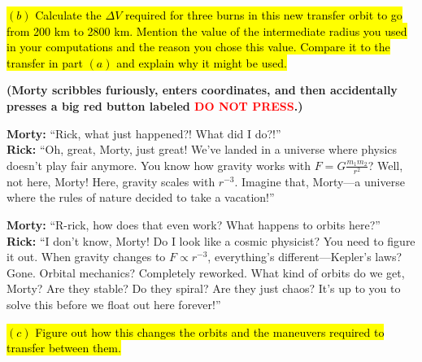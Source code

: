 \documentclass[a4paper, 12pt]{exam}
\begin{document}
\begin{center}
\end{center}

\hl{$(b)$ Calculate the $\Delta V$ required for three burns in this new transfer orbit to go from 200 km to 2800 km. Mention the value of the intermediate radius you used in your computations and the reason you chose this value. Compare it to the transfer in part $(a)$ and explain why it might be used.}

\bigskip

\noindent \textbf{(Morty scribbles furiously, enters coordinates, and then accidentally presses a big red button labeled \textcolor{red}{DO NOT PRESS}.)}

\bigskip

\noindent \textbf{Morty:} “Rick, what just happened?! What did I do?!” \\

\noindent \textbf{Rick:} “Oh, great, Morty, just great! We’ve landed in a universe where physics doesn’t play fair anymore. You know how gravity works with $F = G \frac{m_1 m_2}{r^2}$? Well, not here, Morty! Here, gravity scales with $r^{-3}$. Imagine that, Morty—a universe where the rules of nature decided to take a vacation!”

\bigskip

\noindent \textbf{Morty:} “R-rick, how does that even work? What happens to orbits here?” \\

\noindent \textbf{Rick:} “I don’t know, Morty! Do I look like a cosmic physicist? You need to figure it out. When gravity changes to $F \propto r^{-3}$, everything’s different—Kepler’s laws? Gone. Orbital mechanics? Completely reworked. What kind of orbits do we get, Morty? Are they stable? Do they spiral? Are they just chaos? It’s up to you to solve this before we float out here forever!”

\bigskip

\hl{$(c)$ Figure out how this changes the orbits and the maneuvers required to transfer between them.}
\end{document}
